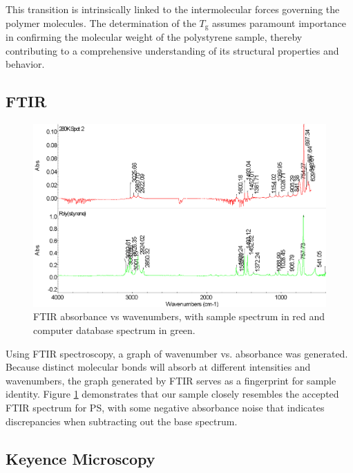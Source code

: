 \documentclass[twocolumn]{article}
\begin{document}
                This transition is intrinsically linked to the intermolecular forces governing the polymer molecules\autocite{WOS:COUCHMAN}. The determination of the $T_\text{g}$ assumes paramount importance in confirming the molecular weight of the polystyrene sample, thereby contributing to a comprehensive understanding of its structural properties and behavior.

            \subsection{FTIR}
                \begin{figure}[H]
                    \centering
                    \includegraphics[width=\columnwidth]{img/ftir-comp.png}
                    \caption{FTIR absorbance vs wavenumbers, with sample spectrum in red and computer database spectrum in green.}\label{fig:ftir-comp}
                \end{figure}
                Using FTIR spectroscopy, a graph of wavenumber vs. absorbance  was generated. Because distinct  molecular bonds will absorb at different intensities and wavenumbers, the graph generated by FTIR serves as a fingerprint for sample identity. Figure \ref{fig:ftir-comp} demonstrates that our sample closely resembles the accepted FTIR spectrum for PS, with some negative absorbance noise that indicates discrepancies when subtracting out the base spectrum.
            
            \subsection{Keyence Microscopy}
\end{document}
